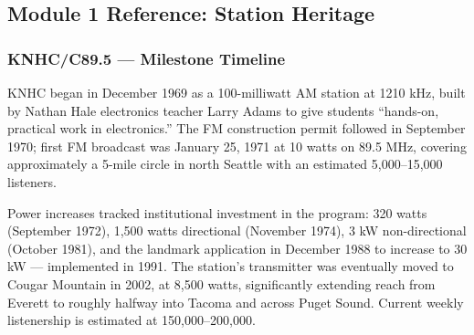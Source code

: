 \documentclass[11pt,letterpaper]{article}
\begin{document}
\subsection{Module 1 Reference: Station Heritage}

\subsubsection{KNHC/C89.5 --- Milestone Timeline}

KNHC began in December 1969 as a 100-milliwatt AM station at 1210 kHz, built by Nathan Hale electronics teacher Larry Adams to give students ``hands-on, practical work in electronics.'' The FM construction permit followed in September 1970; first FM broadcast was January 25, 1971 at 10 watts on 89.5 MHz, covering approximately a 5-mile circle in north Seattle with an estimated 5,000--15,000 listeners.

Power increases tracked institutional investment in the program: 320 watts (September 1972), 1,500 watts directional (November 1974), 3 kW non-directional (October 1981), and the landmark application in December 1988 to increase to 30 kW --- implemented in 1991. The station's transmitter was eventually moved to Cougar Mountain in 2002, at 8,500 watts, significantly extending reach from Everett to roughly halfway into Tacoma and across Puget Sound. Current weekly listenership is estimated at 150,000--200,000.
\end{document}
